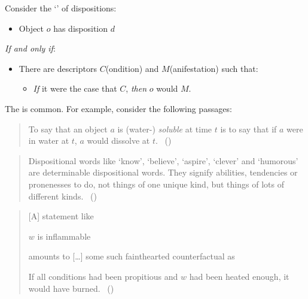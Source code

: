\begin{note}
  Consider the `' of dispositions:%

  \begin{sketch}[\dBCA{2}]
    \label{sketch:dBCA}
    \vspace{-\baselineskip}
    \begin{itemize}
    \item
      Object \(o\) has disposition \(d\)
    \end{itemize}
    \emph{If and only if}:
    \begin{itemize}
    \item
      There are descriptors \(C\)(ondition) and \(M\)(anifestation) such that:
      \begin{itemize}
      \item
        \emph{If} it were the case that \(C\), \emph{then} \(o\) would \(M\).
      \end{itemize}
    \end{itemize}
    \vspace{-\baselineskip}
  \end{sketch}

  \noindent%
  The  is common.
  For example, consider the following passages:

  \begin{quote}
    To say that an object \(a\) is (water-) \emph{soluble} at time \(t\) is to say that if \(a\) were in water at \(t\), \(a\) would dissolve at \(t\).%
    \mbox{ }\hfill\mbox{(\cite[203]{Quine:2013aa})}
  \end{quote}

  \begin{quote}
    Dispositional words like `know', `believe', `aspire', `clever' and `humorous' are determinable dispositional words.
    They signify abilities, tendencies or pronenesses to do, not things of one unique kind, but things of lots of different kinds.%
    \mbox{ }\hfill\mbox{(\cite[118]{Ryle:1949aa})}
  \end{quote}

  \begin{quote}
    [A] statement like

    \(w\) is inflammable

    amounts to [\dots] some such fainthearted counterfactual as

    If all conditions had been propitious and \(w\) had been heated enough, it would have burned.%
    \mbox{ }\hfill\mbox{(\cite[39]{Goodman:1983aa})}
  \end{quote}
\end{note}

